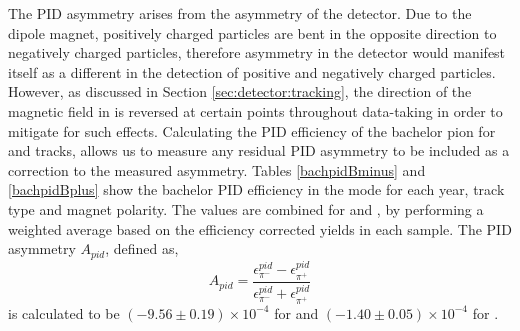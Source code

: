 The PID asymmetry arises from the asymmetry of the detector. Due to the \lhcb dipole magnet, positively charged particles are bent in the opposite direction to negatively charged particles, therefore asymmetry in the detector would manifest itself as a different in the detection of positive and negatively charged particles. However, as discussed in Section \ref{sec:detector:tracking}, the direction of the magnetic field in \lhcb is reversed at certain points throughout data-taking in order to mitigate for such effects. Calculating the PID efficiency of the bachelor pion for \Bp and \Bm tracks, allows us to measure any residual PID asymmetry to be included as a correction to the measured asymmetry. Tables \ref{bachpidBminus} and \ref{bachpidBplus} show the bachelor PID efficiency in the \kpi mode for each year, \KS track type and magnet polarity. The values are combined for \runone and \runtwo, by performing a weighted average based on the efficiency corrected yields in each sample. The PID asymmetry $A_{pid}$, defined as,
\begin{equation*}
A_{pid} = \frac{\epsilon_{\pi^-}^{pid} - \epsilon_{\pi^+}^{pid}}{\epsilon_{\pi^-}^{pid} + \epsilon_{\pi^+}^{pid}}
\end{equation*}
is calculated to be $(-9.56 \pm 0.19) \times 10^{-4}$ for \runone and $(-1.40 \pm 0.05) \times 10^{-4}$ for \runtwo. 


